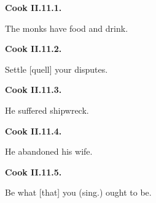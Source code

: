 \par\begin{minipage}{\linewidth}\raggedright
\textbf{Cook II.11.1.}

The monks have food and drink.

\end{minipage}\par\addvspace{4pt}

\par\begin{minipage}{\linewidth}\raggedright
\textbf{Cook II.11.2.}

Settle [quell] your disputes.

\end{minipage}\par\addvspace{4pt}

\par\begin{minipage}{\linewidth}\raggedright
\textbf{Cook II.11.3.}

He suffered shipwreck.

\end{minipage}\par\addvspace{4pt}

\par\begin{minipage}{\linewidth}\raggedright
\textbf{Cook II.11.4.}

He abandoned his wife.

\end{minipage}\par\addvspace{4pt}

\par\begin{minipage}{\linewidth}\raggedright
\textbf{Cook II.11.5.}

Be what [that] you (sing.) ought to be.

\end{minipage}\par\addvspace{4pt}

